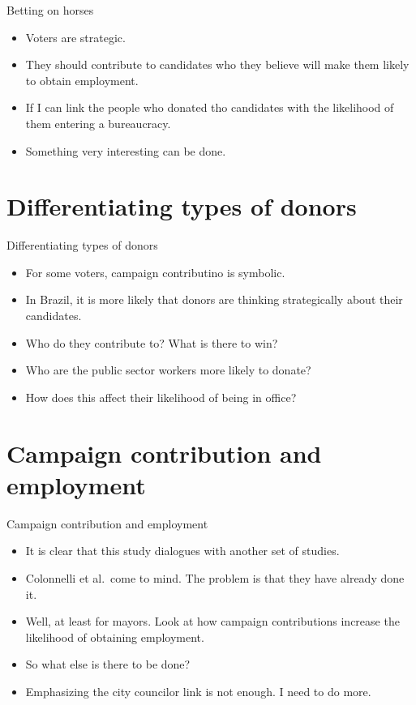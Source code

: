 \documentclass[
  ignorenonframetext,
]{beamer}
\providecommand{\tightlist}{%
  \setlength{\itemsep}{0pt}\setlength{\parskip}{0pt}}
\begin{document}
\begin{frame}{Betting on horses}
\begin{itemize}
\tightlist
\item
  Voters are strategic.
\item
  They should contribute to candidates who they believe will make them
  likely to obtain employment.
\item
  If I can link the people who donated tho candidates with the
  likelihood of them entering a bureaucracy.
\item
  Something very interesting can be done.
\end{itemize}
\end{frame}

\hypertarget{differentiating-types-of-donors}{%
\section{Differentiating types of
donors}\label{differentiating-types-of-donors}}

\begin{frame}{Differentiating types of donors}
\begin{itemize}
\tightlist
\item
  For some voters, campaign contributino is symbolic.
\item
  In Brazil, it is more likely that donors are thinking strategically
  about their candidates.
\item
  Who do they contribute to? What is there to win?
\item
  Who are the public sector workers more likely to donate?
\item
  How does this affect their likelihood of being in office?
\end{itemize}
\end{frame}

\hypertarget{campaign-contribution-and-employment}{%
\section{Campaign contribution and
employment}\label{campaign-contribution-and-employment}}

\begin{frame}{Campaign contribution and employment}
\begin{itemize}
\tightlist
\item
  It is clear that this study dialogues with another set of studies.
\item
  Colonnelli et al.~come to mind. The problem is that they have already
  done it.
\item
  Well, at least for mayors. Look at how campaign contributions increase
  the likelihood of obtaining employment.
\item
  So what else is there to be done?
\item
  Emphasizing the city councilor link is not enough. I need to do more.
\end{itemize}
\end{frame}
\end{document}
